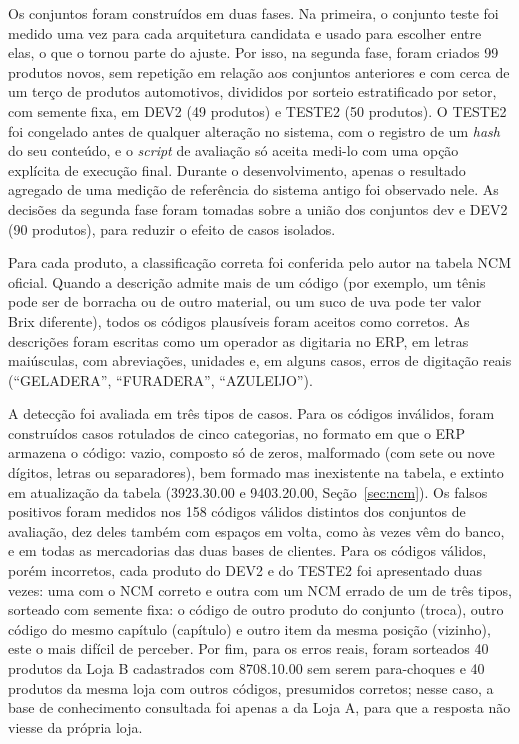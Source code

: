 Os conjuntos foram construídos em duas fases. Na primeira, o conjunto teste foi medido uma vez para cada arquitetura candidata e usado para escolher entre elas, o que o tornou parte do ajuste. Por isso, na segunda fase, foram criados 99 produtos novos, sem repetição em relação aos conjuntos anteriores e com cerca de um terço de produtos automotivos, divididos por sorteio estratificado por setor, com semente fixa, em DEV2 (49 produtos) e TESTE2 (50 produtos). O TESTE2 foi congelado antes de qualquer alteração no sistema, com o registro de um \textit{hash} do seu conteúdo, e o \textit{script} de avaliação só aceita medi-lo com uma opção explícita de execução final. Durante o desenvolvimento, apenas o resultado agregado de uma medição de referência do sistema antigo foi observado nele. As decisões da segunda fase foram tomadas sobre a união dos conjuntos dev e DEV2 (90 produtos), para reduzir o efeito de casos isolados.

Para cada produto, a classificação correta foi conferida pelo autor na tabela NCM oficial. Quando a descrição admite mais de um código (por exemplo, um tênis pode ser de borracha ou de outro material, ou um suco de uva pode ter valor Brix diferente), todos os códigos plausíveis foram aceitos como corretos. As descrições foram escritas como um operador as digitaria no ERP, em letras maiúsculas, com abreviações, unidades e, em alguns casos, erros de digitação reais (``GELADERA'', ``FURADERA'', ``AZULEIJO'').

A detecção foi avaliada em três tipos de casos. Para os códigos inválidos, foram construídos casos rotulados de cinco categorias, no formato em que o ERP armazena o código: vazio, composto só de zeros, malformado (com sete ou nove dígitos, letras ou separadores), bem formado mas inexistente na tabela, e extinto em atualização da tabela (3923.30.00 e 9403.20.00, Seção~\ref{sec:ncm}). Os falsos positivos foram medidos nos 158 códigos válidos distintos dos conjuntos de avaliação, dez deles também com espaços em volta, como às vezes vêm do banco, e em todas as mercadorias das duas bases de clientes. Para os códigos válidos, porém incorretos, cada produto do DEV2 e do TESTE2 foi apresentado duas vezes: uma com o NCM correto e outra com um NCM errado de um de três tipos, sorteado com semente fixa: o código de outro produto do conjunto (troca), outro código do mesmo capítulo (capítulo) e outro item da mesma posição (vizinho), este o mais difícil de perceber. Por fim, para os erros reais, foram sorteados 40 produtos da Loja B cadastrados com 8708.10.00 sem serem para-choques e 40 produtos da mesma loja com outros códigos, presumidos corretos; nesse caso, a base de conhecimento consultada foi apenas a da Loja A, para que a resposta não viesse da própria loja.

